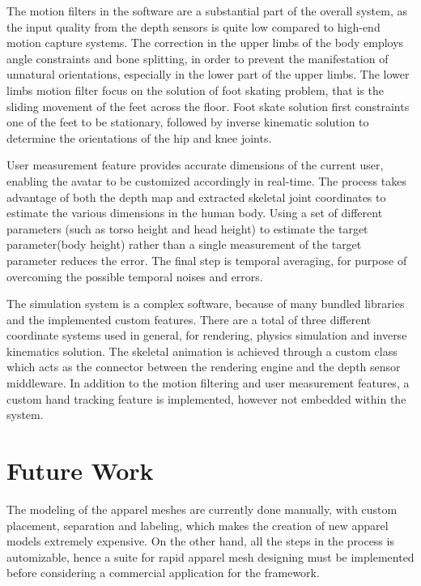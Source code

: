 The motion filters in the software are a substantial part of the overall system, as the input quality from the depth sensors  is quite low compared to high-end motion capture systems. The correction in the upper limbs of the body employs angle constraints and bone splitting, in order to prevent the manifestation of unnatural orientations, especially in the lower part of the upper limbs. The lower limbs motion filter focus on the solution of foot skating problem, that is the sliding movement of the feet across the floor. Foot skate solution first constraints one of the feet to be stationary, followed by inverse kinematic solution to determine the orientations of the hip and knee joints. 

User measurement feature provides accurate dimensions of the current user, enabling the avatar to be customized accordingly in real-time. The process takes advantage of both the depth map and extracted skeletal joint coordinates to estimate the various dimensions in the human body. Using a set of different parameters (such as torso height and head height) to estimate the target parameter(body height) rather than a single measurement of the target parameter reduces the error. The final step is temporal averaging, for purpose of overcoming the possible temporal noises and errors.   

The simulation system is a complex software, because of many bundled libraries and the implemented custom features. There are a total of three different coordinate systems used in general, for rendering, physics simulation and inverse kinematics solution. The skeletal animation is achieved through a custom class which acts as the connector between the rendering engine and the depth sensor middleware. In addition to the motion filtering and user measurement features, a custom hand tracking feature is implemented, however not embedded within the system. 

\section{Future Work}

The modeling of the apparel meshes are currently done manually, with custom placement, separation and labeling, which makes the creation of new apparel models extremely expensive. On the other hand, all the steps in the process is automizable, hence a suite for rapid apparel mesh designing must be implemented before considering a commercial application for the framework.  

